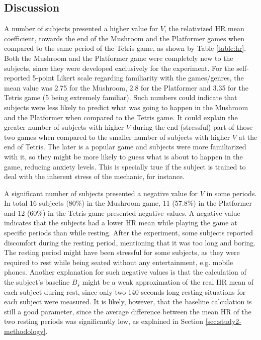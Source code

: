 \subsection{Discussion}

A number of subjects presented a higher value for $V$, the relativized HR mean coefficient, towards the end of the Mushroom and the Platformer games when compared to the same period of the Tetris game, as shown by Table \ref{table:hr}. Both the Mushroom and the Platformer game were completely new to the subjects, since they were developed exclusively for the experiment. For the self-reported 5-point Likert scale regarding familiarity with the games/genres, the mean value was 2.75 for the Mushroom, 2.8 for the Platformer and 3.35 for the Tetris game (5 being extremely familiar). Such numbers could indicate that subjects were less likely to predict what was going to happen in the Mushroom and the Platformer when compared to the Tetris game. It could explain the greater number of subjects with higher $V$ during the end (stressful) part of those two games when compared to the smaller number of subjects with higher $V$ at the end of Tetris. The later is a popular game and subjects were more familiarized with it, so they might be more likely to guess what is about to happen in the game, reducing anxiety levels. This is specially true if the subject is trained to deal with the inherent stress of the mechanic, for instance.

A significant number of subjects presented a negative value for $V$ in some periods. In total 16 subjects (80\%) in the Mushroom game, 11 (57.8\%) in the Platformer and 12 (60\%) in the Tetris game presented negative values. A negative value indicates that the subjects had a lower HR mean while playing the game at specific periods than while resting. After the experiment, some subjects reported discomfort during the resting period, mentioning that it was too long and boring. The resting period might have been stressful for some subjects, as they were required to rest while being seated without any entertainment, e.g. mobile phones. Another explanation for such negative values is that the calculation of the subject's baseline $B_s$ might be a weak approximation of the real HR mean of each subject during rest, since only two 140-seconds long resting situations for each subject were measured. It is likely, however, that the baseline calculation is still a good parameter, since the average difference between the mean HR of the two resting periods was significantly low, as explained in Section \ref{sec:study2-methodology}.

